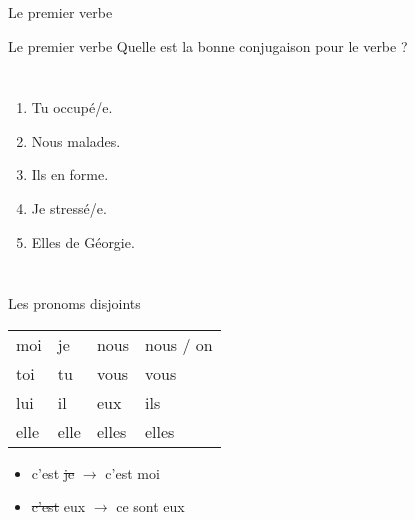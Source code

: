 \documentclass{beamer}
\begin{document}
  \begin{frame}{Le premier verbe }
    \begin{center}
      
    \end{center}
  \end{frame}

  \begin{frame}{Le premier verbe }
    Quelle est la bonne conjugaison pour le verbe ? \\
    \begin{columns}
        \begin{enumerate}
          \item Tu \underline{} occupé/e.
          \item Nous \underline{} malades.
          \item Ils \underline{} en forme.
          \item Je \underline{} stressé/e.
          \item Elles \underline{} de Géorgie.
        \end{enumerate}
        \begin{minipage}[c][0.6\textheight]{\linewidth}
          \begin{center}
          \end{center}
        \end{minipage}
    \end{columns}
  \end{frame}

  \begin{frame}{Les pronoms disjoints}
    \begin{center}
      \begin{tabular}{l l l l}
        \alert{moi}  & je   & \alert{nous}  & nous / on \\
        \alert{toi}  & tu   & \alert{vous}  & vous \\
        \alert{lui}  & il   & \alert{eux}   & ils \\
        \alert{elle} & elle & \alert{elles} & elles \\
      \end{tabular}
    \end{center}
    \begin{itemize}
      \item c'est \sout{je} $\to$ c'est \alert{moi}
      \item \sout{c'est} eux $\to$ \alert{ce sont} eux
    \end{itemize}
  \end{frame}
\end{document}
